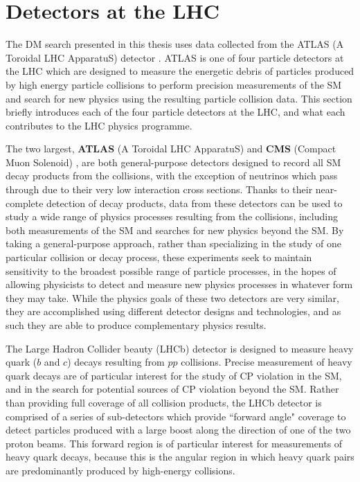 \section{Detectors at the LHC}

The DM search presented in this thesis uses data collected from the ATLAS (A Toroidal LHC ApparatuS) detector \cite{atlas}. ATLAS is one of four particle detectors at the LHC which are designed to measure the energetic debris of particles produced by high energy particle collisions to perform precision measurements of the SM and search for new physics using the resulting particle collision data. This section briefly introduces each of the four particle detectors at the LHC, and what each contributes to the LHC physics programme.

The two largest, \textbf{ATLAS} (A Toroidal LHC ApparatuS) \cite{atlas} and \textbf{CMS} (Compact Muon Solenoid) \cite{cms}, are both general-purpose detectors designed to record all SM decay products from the collisions, with the exception of neutrinos which pass through due to their very low interaction cross sections. Thanks to their near-complete detection of decay products, data from these detectors can be used to study a wide range of physics processes resulting from the collisions, including both measurements of the SM and searches for new physics beyond the SM. By taking a general-purpose approach, rather than specializing in the study of one particular collision or decay process, these experiments seek to maintain sensitivity to the broadest possible range of particle processes, in the hopes of allowing physicists to detect and measure new physics processes in whatever form they may take. While the physics goals of these two detectors are very similar, they are accomplished using different detector designs and technologies, and as such they are able to produce complementary physics results.

The Large Hadron Collider beauty (LHCb) detector \cite{LHCb} is designed to measure heavy quark (\(b\) and \(c\)) decays resulting from \(pp\) collisions. Precise measurement of heavy quark decays are of particular interest for the study of CP violation in the SM, and in the search for potential sources of CP violation beyond the SM. Rather than providing full coverage of all collision products, the LHCb detector is comprised of a series of sub-detectors which provide ``forward angle" coverage to detect particles produced with a large boost along the direction of one of the two proton beams. This forward region is of particular interest for measurements of heavy quark decays, because this is the angular region in which heavy quark pairs are predominantly produced by high-energy collisions.

